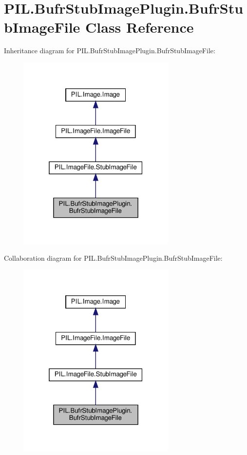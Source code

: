 \hypertarget{classPIL_1_1BufrStubImagePlugin_1_1BufrStubImageFile}{}\section{P\+I\+L.\+Bufr\+Stub\+Image\+Plugin.\+Bufr\+Stub\+Image\+File Class Reference}
\label{classPIL_1_1BufrStubImagePlugin_1_1BufrStubImageFile}


Inheritance diagram for P\+I\+L.\+Bufr\+Stub\+Image\+Plugin.\+Bufr\+Stub\+Image\+File\+:
\nopagebreak
\begin{figure}[H]
\begin{center}
\leavevmode
\includegraphics[width=223pt]{classPIL_1_1BufrStubImagePlugin_1_1BufrStubImageFile__inherit__graph}
\end{center}
\end{figure}


Collaboration diagram for P\+I\+L.\+Bufr\+Stub\+Image\+Plugin.\+Bufr\+Stub\+Image\+File\+:
\nopagebreak
\begin{figure}[H]
\begin{center}
\leavevmode
\includegraphics[width=223pt]{classPIL_1_1BufrStubImagePlugin_1_1BufrStubImageFile__coll__graph}
\end{center}
\end{figure}
